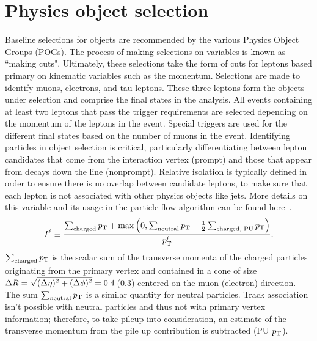 \section{Physics object selection} 
\label{sec:objsel}
Baseline selections for objects are recommended by the various Physics Object Groups (POGs). The process of making selections on variables is known as ``making cuts". Ultimately, these selections take the form of cuts for leptons based primary on kinematic variables such as the momentum. 
Selections are made to identify muons, electrons, and tau leptons. These three leptons form the objects under selection and comprise the final states in the analysis.
All events containing at least two leptons that pass the trigger requirements are selected depending on the momentum of the leptons in the event. Special triggers are used for the different final states based on the number of muons in the event. 
Identifying particles in object selection is critical, particularly differentiating between lepton candidates that come from the interaction vertex (prompt) and those that appear from decays down the line (nonprompt). Relative isolation is typically defined in order to ensure there is no overlap between candidate leptons, to make sure that each lepton is not associated with other physics objects like jets. More details on this variable and its usage in the particle flow algorithm can be found here~\cite{Sirunyan_2017}. 
\begin{equation}
I^{\ell} \equiv \frac{\sum_\text{charged}  p_{\mathrm{T}} + \max\left( 0, \sum_\text{neutral}  p_{\mathrm{T}}
                                         - \frac{1}{2} \sum_\text{charged, PU} p_{\mathrm{T}}  \right )}{p_{\mathrm{T}}^{\ell}}.
\label{eq:reconstruction_isolation}
\end{equation}
$\sum_\text{charged}  p_{\mathrm{T}}$ is the scalar sum of the
transverse momenta of the charged particles originating from
the primary vertex and contained in a cone of size
$\Delta R = \sqrt{\smash[b]{(\Delta \eta)^2 + (\Delta \phi)^2}} = 0.4$\,(0.3)
centered on the muon (electron) direction. The sum $\sum_\text{neutral}  p_{\mathrm{T}}$ is
a similar quantity for neutral particles. Track association isn't possible with neutral particles and thus not with primary vertex information; therefore, to take pileup into consideration, an estimate of the transverse momentum from the pile up contribution is subtracted (PU $p_{\mathrm{T}}$).  

